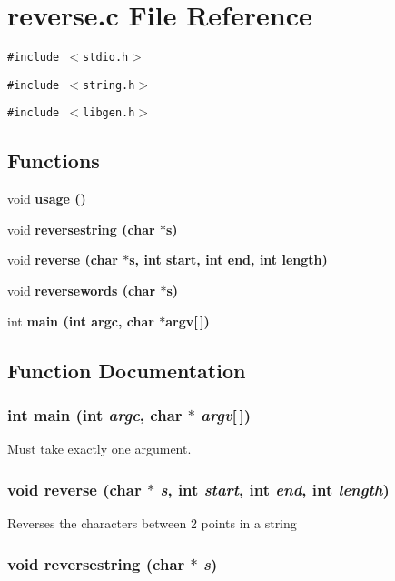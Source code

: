 \section{reverse.c File Reference}
\label{reverse_8c}
{\tt \#include $<$stdio.h$>$}\par
{\tt \#include $<$string.h$>$}\par
{\tt \#include $<$libgen.h$>$}\par
\subsection*{Functions}
\begin{CompactItemize}
\item 
void \bf{usage} ()
\item 
void \bf{reversestring} (char $\ast$s)
\item 
void \bf{reverse} (char $\ast$s, int start, int end, int length)
\item 
void \bf{reversewords} (char $\ast$s)
\item 
int \bf{main} (int argc, char $\ast$argv[$\,$])
\end{CompactItemize}


\subsection{Function Documentation}
\subsubsection{\setlength{\rightskip}{0pt plus 5cm}int main (int {\em argc}, char $\ast$ {\em argv}[$\,$])}\label{reverse_8c_0ddf1224851353fc92bfbff6f499fa97}


Must take exactly one argument. 
\subsubsection{\setlength{\rightskip}{0pt plus 5cm}void reverse (char $\ast$ {\em s}, int {\em start}, int {\em end}, int {\em length})}\label{reverse_8c_3fa94de2ffc9c309ae3279ebaf38c775}


Reverses the characters between 2 points in a string 
\subsubsection{\setlength{\rightskip}{0pt plus 5cm}void reversestring (char $\ast$ {\em s})}\label{reverse_8c_2de0716c6c6b72b57cfed26ba7f70d00}


